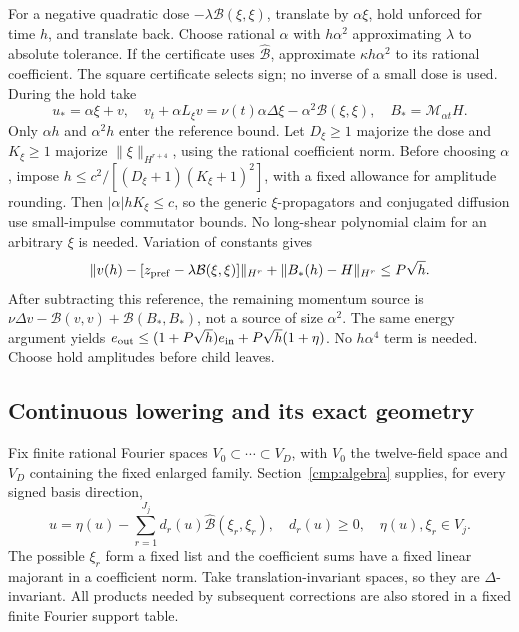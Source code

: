 \documentclass[11pt,a4paper]{amsart}
\theoremstyle{definition}
\theoremstyle{remark}
\numberwithin{equation}{section}
\newcommand{\Bcal}{\mathcal B}
\newcommand{\Bhat}{\widehat{\Bcal}}
\begin{document}
For a negative quadratic dose $-\lambda \Bcal(\xi,\xi)$, translate by
$\alpha\xi$, hold unforced for time $h$, and translate back. Choose rational
$\alpha$ with $h\alpha^2$ approximating $\lambda$ to absolute tolerance.
If the certificate uses $\Bhat$, approximate $\kappa h\alpha^2$ to
its rational coefficient. The square certificate selects sign; no inverse
of a small dose is used. During the hold take
\[
 u_*=\alpha\xi+v,\quad
 v_t+\alpha L_\xi v=\nu(t)\alpha\Delta\xi-\alpha^2\Bcal(\xi,\xi),
 \quad B_*=\mathcal M_{\alpha t}H.
\]
Only $\alpha h$ and $\alpha^2h$ enter the reference bound. Let $D_\xi\ge1$ majorize the dose and $K_\xi\ge1$ majorize $\|\xi\|_{H^{r+4}}$, using the rational coefficient norm. Before choosing $\alpha$, impose $h\le c^2/[(D_\xi+1)(K_\xi+1)^2]$, with a fixed allowance for amplitude rounding. Then $|\alpha|hK_\xi\le c$, so the generic $\xi$-propagators and conjugated diffusion use small-impulse commutator bounds. No long-shear polynomial claim for an arbitrary $\xi$ is needed. Variation of constants gives
\[
 \|v(h)-[z_{\rm pref}-\lambda \Bcal(\xi,\xi)]\|_{H^r}
 +\|B_*(h)-H\|_{H^r}\le P\sqrt h.
\]
After subtracting this reference, the remaining momentum source is
$\nu\Delta v-\Bcal(v,v)+\Bcal(B_*,B_*)$, not a source of size $\alpha^2$.
The same energy argument yields
$e_{\rm out}\le(1+P\sqrt h)e_{\rm in}+P\sqrt h(1+\eta)$.
No $h\alpha^4$ term is needed. Choose hold amplitudes before child leaves.

\subsection{Continuous lowering and its exact geometry}\label{cmp:lowering}

Fix finite rational Fourier spaces $V_0\subset\cdots\subset V_D$, with
$V_0$ the twelve-field space and $V_D$ containing the fixed enlarged family.
Section~\ref{cmp:algebra} supplies, for every signed basis direction,
\begin{equation}
 u=\eta(u)-\sum_{r=1}^{J_j}d_r(u)\Bhat(\xi_r,\xi_r),
 \quad d_r(u)\ge0,\quad\eta(u),\xi_r\in V_j.
 \label{cmp:lower-certificate}
\end{equation}
The possible $\xi_r$ form a fixed list and the coefficient sums have a fixed
linear majorant in a coefficient norm. Take translation-invariant spaces,
so they are $\Delta$-invariant. All products needed by subsequent corrections
are also stored in a fixed finite Fourier support table.
\end{document}
